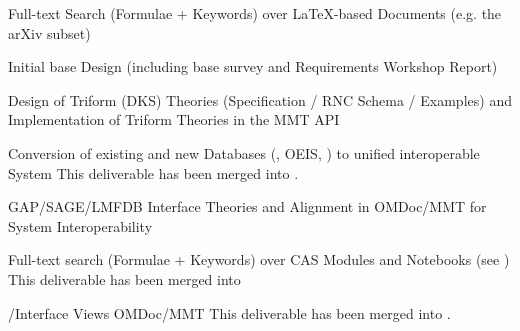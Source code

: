 \begin{workpackage}[id=dksbases,%
  title=Data/Knowledge/Software-Bases,lead=FAU,
  ZHRM=12,JURM=12,FAURM=34,UWRM=25,SARM=10,LLRM=2,PSRM=25]
\begin{wpdelivs}
\begin{wpdeliv}[id=mws,miles=startup,due=9,nature=OTHER,dissem=PU,lead=JU,issue=133, status=delivered]
    {Full-text Search (Formulae + Keywords) over LaTeX-based Documents
      (e.g. the arXiv subset)}
  \end{wpdeliv}
  \begin{wpdeliv}[due=12,miles=startup,id=design,dissem=PU,nature=R,lead=JU,issue=136, status=delivered]
    {Initial \DKS base Design (including base survey and Requirements Workshop Report)}
  \end{wpdeliv}
  \begin{wpdeliv}[due=15,miles=proto1,id=dkstheories,dissem=PU,nature=R,lead=JU,issue=137, status=delivered]
    {Design of Triform (DKS) Theories (Specification / RNC Sche\-ma / Examples) and 
      Implementation of Triform Theories in the MMT API}
  \end{wpdeliv}
  \begin{wpdeliv}[due=24,id=conv,dissem=PU,nature=DEC,lead=ZH,issue=138,status=canceled]
    {Conversion of existing and new Databases (\LMFDB, OEIS, \FindStat) to unified interoperable
      System}
    This deliverable has been merged into .
  \end{wpdeliv}
  \begin{wpdeliv}[due=24,id=psfoundation,dissem=PU,nature=OTHER,lead=FAU,issue=139]
    {GAP/SAGE/LMFDB Interface Theories and Alignment in OMDoc/MMT for
      System Interoperability}
  \end{wpdeliv}
  \begin{wpdeliv}[id=notebooksearch,due=30,nature=OTHER,dissem=PU,lead=FAU,issue=140,status=canceled]
    {Full-text search (Formulae + Keywords) over CAS Modules and Notebooks} (see
      )
    This deliverable has been merged into 
  \end{wpdeliv}
  \begin{wpdeliv}[due=36,id=pssem,dissem=PU,nature=OTHER,lead=FAU,issue=141,status=canceled]
    {\GAP/\Sage Interface Views OMDoc/MMT}
    This deliverable has been merged into .
  \end{wpdeliv}

\end{wpdelivs}
\end{workpackage}
